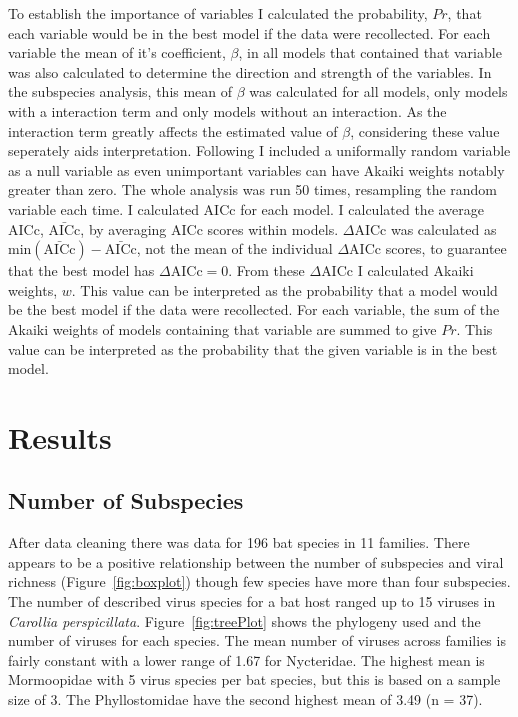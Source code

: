 To establish the importance of variables I calculated the probability, $Pr$, that each variable would be in the best model if the data were recollected.
For each variable the mean of it's coefficient, $\beta$, in all models that contained that variable was also calculated to determine the direction and strength of the variables.
In the subspecies analysis, this mean of $\beta$ was calculated for all models, only models with a interaction term and only models without an interaction.
As the interaction term greatly affects the estimated value of $\beta$, considering these value seperately aids interpretation.
Following \cite{whittingham2005habitat} I included a uniformally random variable as a null variable as even unimportant variables can have Akaiki weights notably greater than zero.
The whole analysis was run 50 times, resampling the random variable each time.
I calculated AICc for each model.
I calculated the average AICc, $\bar{\text{AICc}}$, by averaging AICc scores within models.
$\Delta\text{AICc}$ was calculated as $\text{min}(\bar{\text{AICc}}) - \bar{\text{AICc}}$, not the mean of the individual $\Delta\text{AICc}$ scores, to guarantee that the best model has $\Delta\text{AICc} = 0$.
From these $\Delta\text{AICc}$ I calculated Akaiki weights, $w$.
This value can be interpreted as the probability that a model would be the best model if the data were recollected.
For each variable, the sum of the Akaiki weights of models containing that variable are summed to give $Pr$.
This value can be interpreted as the probability that the given variable is in the best model.




\section{Results}


\subsection{Number of Subspecies}

After data cleaning there was data for 196 bat species in 11 families.
There appears to be a positive relationship between the number of subspecies and viral richness (Figure~\ref{fig:boxplot}) though few species have more than four subspecies. 
The number of described virus species for a bat host ranged up to 15 viruses in \emph{Carollia perspicillata}.
Figure~\ref{fig:treePlot} shows the phylogeny used and the number of viruses for each species.
The mean number of viruses across families is fairly constant with a lower range of 1.67 for Nycteridae.
The highest mean is Mormoopidae with 5 virus species per bat species, but this is based on a sample size of 3.
The Phyllostomidae have the second highest mean  of 3.49 (n = 37).

